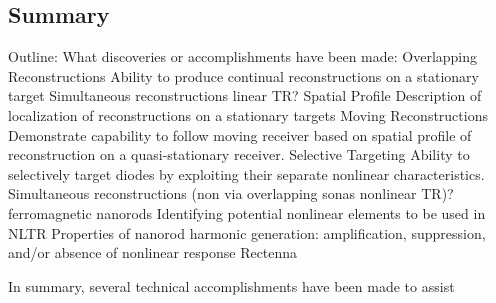 

\subsection{Summary}

Outline:
	What discoveries or accomplishments have been made:
Overlapping Reconstructions
Ability to produce continual reconstructions on a stationary target
Simultaneous reconstructions {linear TR}?
Spatial Profile
Description of localization of reconstructions on a stationary targets
Moving Reconstructions
Demonstrate capability to follow moving receiver based on spatial profile of reconstruction on a quasi-stationary receiver.
Selective Targeting
Ability to selectively target diodes by exploiting their separate nonlinear characteristics.
Simultaneous reconstructions (non via overlapping sonas {nonlinear TR})?
ferromagnetic nanorods
Identifying potential nonlinear elements to be used in NLTR
Properties of nanorod harmonic generation: amplification, suppression, and/or absence of nonlinear response
Rectenna

In summary, several technical accomplishments have been made to assist
